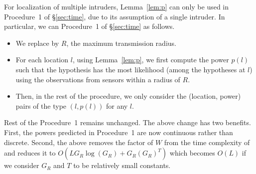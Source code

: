    For localization of
multiple intruders, Lemma~\ref{lem:p} can only be used in Procedure~1
of \S\ref{sec:time}, due to its assumption of a single intruder. In
particular, we can Procedure~1 of \S\ref{sec:time} as follows.
\begin{itemize}
\item
We replace \Rp by $R$, the maximum transmission radius.
  
\item
For each location $l$, using Lemma~\ref{lem:p}, we first compute the
power $p(l)$ such that the hypothesis \hlpl has the most likelihood
(among the hypotheses at $l$) using the observations from sensors
within a radius of $R$.
\item
Then, in the rest of the procedure, we only consider the (location,
power) pairs of the type $(l, p(l))$ for any $l$.
\end{itemize}
Rest of the Procedure~1 remains unchanged. The above change has two
benefits. First, the powers predicted in Procedure~1 are now
continuous rather than discrete. Second, the above removes the factor
of $W$ from the time complexity of \ouralgo and reduces it to
$O(LG_R\log(G_R) + G_R(G_R)^T)$ which becomes $O(L)$ if we consider
$G_R$ and $T$ to be relatively small constants.
